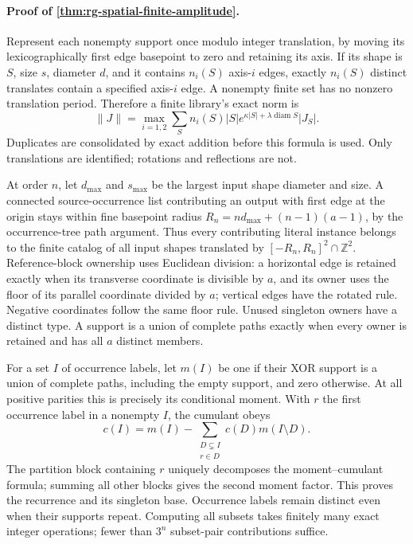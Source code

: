 \paragraph{Proof of \cref{thm:rg-spatial-finite-amplitude}.}
Represent each nonempty support once modulo integer translation, by moving
its lexicographically first edge basepoint to zero and retaining its axis.
If its shape is \(S\), size \(s\), diameter \(d\), and it contains
\(n_i(S)\) axis-\(i\) edges, exactly \(n_i(S)\) distinct translates
contain a specified axis-\(i\) edge. A nonempty finite set has no nonzero
translation period. Therefore a finite library's exact norm is
\begin{equation}
 \|J\|=\max_{i=1,2}\sum_S n_i(S)|S|
                  e^{\kappa|S|+\lambda\operatorname{diam}S}|J_S|.
 \label{eq:rg-spatial-proof-finite-orbit-norm}
\end{equation}
Duplicates are consolidated by exact addition before this formula is used.
Only translations are identified; rotations and reflections are not.

At order \(n\), let \(d_{\max}\) and \(s_{\max}\) be the largest input
shape diameter and size. A connected source-occurrence list contributing
an output with first edge at the origin stays within fine basepoint radius
\(R_n=nd_{\max}+(n-1)(a-1)\), by the occurrence-tree path argument.
Thus every contributing literal instance belongs to the finite catalog
of all input shapes translated by \([-R_n,R_n]^2\cap\mathbb Z^2\).
Reference-block ownership uses Euclidean division: a horizontal edge is
retained exactly when its transverse coordinate is divisible by \(a\),
and its owner uses the floor of its parallel coordinate divided by \(a\);
vertical edges have the rotated rule. Negative coordinates follow the same
floor rule. Unused singleton owners have a distinct type. A support is a
union of complete paths exactly when every owner is retained and has all
\(a\) distinct members.

For a set \(I\) of occurrence labels, let \(m(I)\) be one if their XOR
support is a union of complete paths, including the empty support, and zero
otherwise. At all positive parities this is precisely its conditional
moment. With \(r\) the first occurrence label in a nonempty \(I\), the
cumulant obeys
\begin{equation}
 c(I)=m(I)-\sum_{\substack{D\subsetneq I\\r\in D}}
                           c(D)m(I\setminus D).
 \label{eq:rg-spatial-proof-cumulant-recurrence}
\end{equation}
The partition block containing \(r\) uniquely decomposes the
moment--cumulant formula; summing all other blocks gives the second moment
factor. This proves the recurrence and its singleton base. Occurrence
labels remain distinct even when their supports repeat. Computing all
subsets takes finitely many exact integer operations; fewer than
\(3^n\) subset-pair contributions suffice.

